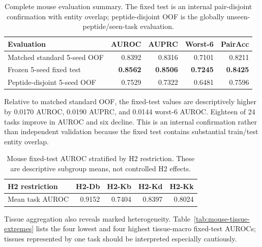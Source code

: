\begin{table}[tbp]
\centering
\caption{Complete mouse evaluation summary. The fixed test is an internal pair-disjoint confirmation with entity overlap; peptide-disjoint OOF is the globally unseen-peptide/seen-task evaluation.}
\label{tab:mouse-protocol-summary}
\small
\setlength{\tabcolsep}{4pt}
\begin{tabular}{lrrrr}
\toprule
Evaluation & AUROC & AUPRC & Worst-6 & PairAcc \\ 
\midrule
Matched standard 5-seed OOF & 0.8392 & 0.8316 & 0.7101 & 0.8211 \\ 
Frozen 5-seed fixed test & \textbf{0.8562} & \textbf{0.8506} & \textbf{0.7245} & \textbf{0.8425} \\ 
Peptide-disjoint 5-seed OOF & 0.7529 & 0.7322 & 0.6481 & 0.7596 \\ 
\bottomrule
\end{tabular}
\end{table}

Relative to matched standard OOF, the fixed-test values are descriptively higher by 0.0170 AUROC, 0.0190 AUPRC, and 0.0144 worst-6 AUROC. Eighteen of 24 tasks improve in AUROC and six decline. This is an internal confirmation rather than independent validation because the fixed test contains substantial train/test entity overlap.

\begin{table}[tbp]
\centering
\caption{Mouse fixed-test AUROC stratified by H2 restriction. These are descriptive subgroup means, not controlled H2 effects.}
\label{tab:mouse-h2-groups}
\small
\begin{tabular}{lrrrr}
\toprule
H2 restriction & H2-Db & H2-Kb & H2-Kd & H2-Kk \\ 
\midrule
Mean task AUROC & 0.9152 & 0.7404 & 0.8397 & 0.8024 \\ 
\bottomrule
\end{tabular}
\end{table}

Tissue aggregation also reveals marked heterogeneity. Table~\ref{tab:mouse-tissue-extremes} lists the four lowest and four highest tissue-macro fixed-test AUROCs; tissues represented by one task should be interpreted especially cautiously.

